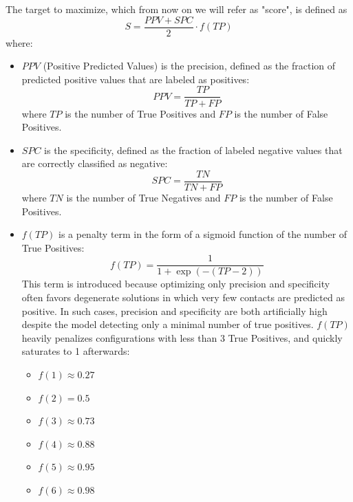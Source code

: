 The target to maximize, which from now on we will refer as "score", is defined as 
\begin{equation}    \label{eq:score}
    S = \frac{PPV+SPC}{2}\cdot f(TP)
\end{equation}
where:
\begin{itemize}
    \item $PPV$ (Positive Predicted Values) is the precision, defined as the 
    fraction of predicted positive values that are labeled as positives:
    \begin{equation}
        PPV = \frac{TP}{TP + FP}
    \end{equation}
    where $TP$ is the number of True Positives and $FP$ is the number of False
    Positives.
    
    \item $SPC$ is the specificity, defined as the fraction of labeled negative
    values that are correctly classified as negative:
    \begin{equation}
        SPC = \frac{TN}{TN + FP}
    \end{equation}
    where $TN$ is the number of True Negatives and $FP$ is the number of False
    Positives.

    \item $f(TP)$ is a penalty term in the
    form of a sigmoid function of the number of True Positives:
    \begin{equation}
        f(TP)=\frac{1}{1+\exp{\left(-(TP-2)\right)}}
    \end{equation}
    This term is introduced because optimizing only precision and specificity 
    often favors degenerate solutions in which very few contacts are predicted
    as positive.
    In such cases, precision and specificity are both artificially high
    despite the model detecting only a minimal number of true positives.
    $f(TP)$ heavily penalizes configurations with less than 3 True Positives,
    and quickly saturates to 1 afterwards:
    \begin{itemize}
        \item $f(1)\approx0.27$
        \item $f(2)=0.5$
        \item $f(3)\approx0.73$
        \item $f(4)\approx0.88$
        \item $f(5)\approx0.95$
        \item $f(6)\approx0.98$
    \end{itemize}
\end{itemize}

